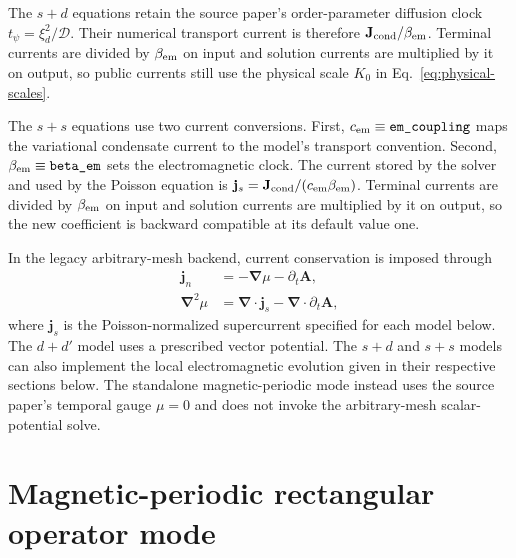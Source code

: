 \documentclass[11pt]{article}
\begin{document}
The $s+d$ equations retain the source paper's order-parameter diffusion clock
$t_\psi=\xi_d^2/\mathcal D$.  Their numerical transport current is therefore
$\mathbf J_{\rm cond}/\beta_{\rm em}$.  Terminal currents are divided by
$\beta_{\rm em}$ on input and solution currents are multiplied by it on output,
so public currents still use the physical scale $K_0$ in
Eq.~\eqref{eq:physical-scales}.

The $s+s$ equations use two current conversions.  First,
$c_{\rm em}\equiv\texttt{em\_coupling}$ maps the variational condensate current
to the model's transport convention.  Second,
$\beta_{\rm em}\equiv\texttt{beta\_em}$ sets the electromagnetic clock.  The
current stored by the solver and used by the Poisson equation is
$\mathbf j_s=\mathbf J_{\rm cond}/(c_{\rm em}\beta_{\rm em})$.  Terminal
currents are divided by $\beta_{\rm em}$ on input and solution currents are
multiplied by it on output, so the new coefficient is backward compatible at
its default value one.

In the legacy arbitrary-mesh backend, current conservation is imposed through
\begin{align}
    \mathbf j_n&=-\boldsymbol\nabla\mu-\partial_t\mathbf A,\\
    \boldsymbol\nabla^2\mu
        &=\boldsymbol\nabla\!\cdot\mathbf j_s
          -\boldsymbol\nabla\!\cdot\partial_t\mathbf A,
    \label{eq:poisson-common}
\end{align}
where $\mathbf j_s$ is the Poisson-normalized supercurrent specified for each
model below.  The $d+d'$ model uses a prescribed vector potential.  The $s+d$
and $s+s$ models can also implement the local electromagnetic evolution given
in their respective sections below.  The standalone magnetic-periodic mode
instead uses the source paper's temporal gauge $\mu=0$ and does not invoke the
arbitrary-mesh scalar-potential solve.

\section{Magnetic-periodic rectangular operator mode}
\end{document}
